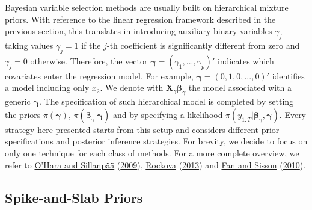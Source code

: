 \documentclass[
  12pt,
]{book}
\theoremstyle{break}
\theoremstyle{nonumberplain}
\begin{document}
Bayesian variable selection methods are usually built on hierarchical
mixture priors. With reference to the linear regression framework
described in the previous section, this translates in introducing
auxiliary binary variables \(\gamma_{j}\) taking values \(\gamma_{j}=1\)
if the \(j\)-th coefficient is significantly different from zero and
\(\gamma_{j}=0\) otherwise. Therefore, the vector
\(\boldsymbol{\gamma}=(\gamma_1,...,\gamma_p)'\) indicates which
covariates enter the regression model. For example,
\(\boldsymbol{\gamma}=(0,1,0,...,0)'\) identifies a model including only
\(x_{2}\). We denote with
\(\boldsymbol{X}_{\gamma}\boldsymbol{\beta}_{\gamma}\) the model
associated with a generic \(\boldsymbol{\gamma}\). The specification of
such hierarchical model is completed by setting the priors
\(\pi(\boldsymbol{\gamma})\),
\(\pi(\boldsymbol{\beta}_{\gamma}|\boldsymbol{\gamma})\) and by
specifying a likelihood
\(\pi(y_{1:T}|\boldsymbol{\beta}_{\gamma},\boldsymbol{\gamma})\). Every
strategy here presented starts from this setup and considers different
prior specifications and posterior inference strategies. For brevity, we
decide to focus on only one technique for each class of methods. For a
more complete overview, we refer to
\protect\hyperlink{ref-OS_2009}{O'Hara and Sillanpää}
(\protect\hyperlink{ref-OS_2009}{2009}),
\protect\hyperlink{ref-R_2013}{Rockova}
(\protect\hyperlink{ref-R_2013}{2013}) and
\protect\hyperlink{ref-fan2010reversible}{Fan and Sisson}
(\protect\hyperlink{ref-fan2010reversible}{2010}).

\subsection{Spike-and-Slab Priors}\label{Indicator Model Selection}
\end{document}
